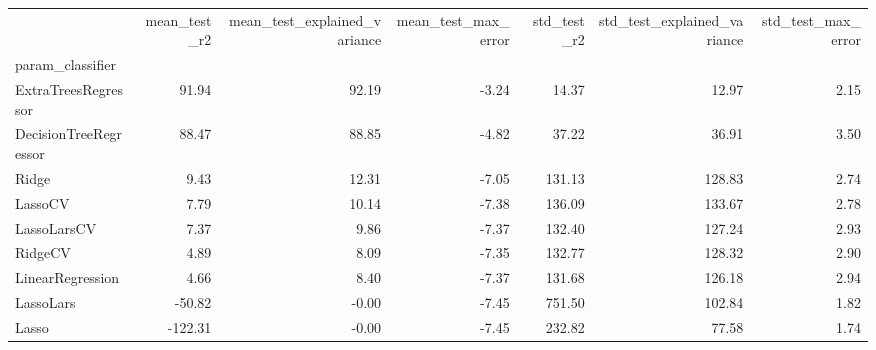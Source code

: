 \begin{tabular}{lrrrrrr}
\toprule
{} &  mean\_test\_r2 &  mean\_test\_explained\_variance &  mean\_test\_max\_error &  std\_test\_r2 &  std\_test\_explained\_variance &  std\_test\_max\_error \\
param\_classifier      &               &                               &                      &              &                              &                     \\
\midrule
ExtraTreesRegressor   &         91.94 &                         92.19 &                -3.24 &        14.37 &                        12.97 &                2.15 \\
DecisionTreeRegressor &         88.47 &                         88.85 &                -4.82 &        37.22 &                        36.91 &                3.50 \\
Ridge                 &          9.43 &                         12.31 &                -7.05 &       131.13 &                       128.83 &                2.74 \\
LassoCV               &          7.79 &                         10.14 &                -7.38 &       136.09 &                       133.67 &                2.78 \\
LassoLarsCV           &          7.37 &                          9.86 &                -7.37 &       132.40 &                       127.24 &                2.93 \\
RidgeCV               &          4.89 &                          8.09 &                -7.35 &       132.77 &                       128.32 &                2.90 \\
LinearRegression      &          4.66 &                          8.40 &                -7.37 &       131.68 &                       126.18 &                2.94 \\
LassoLars             &        -50.82 &                         -0.00 &                -7.45 &       751.50 &                       102.84 &                1.82 \\
Lasso                 &       -122.31 &                         -0.00 &                -7.45 &       232.82 &                        77.58 &                1.74 \\
\bottomrule
\end{tabular}
